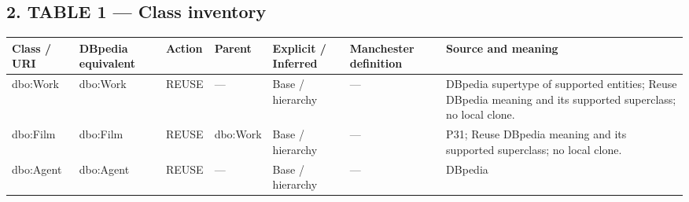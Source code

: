 \documentclass[
  11pt,
]{article}
\newcounter{none} %
\begin{document}
\subsection{2. TABLE 1 --- Class
inventory}\label{table-1-class-inventory}

{\def\LTcaptype{none} %
\begin{longtable}[]{@{}
  >{\raggedright\arraybackslash}p{}
  >{\raggedright\arraybackslash}p{}
  >{\raggedright\arraybackslash}p{}
  >{\raggedright\arraybackslash}p{}
  >{\raggedright\arraybackslash}p{}
  >{\raggedright\arraybackslash}p{}
  >{\raggedright\arraybackslash}p{}@{}}
\toprule\noalign{}
\begin{minipage}[b]{\linewidth}\raggedright
Class / URI
\end{minipage} & \begin{minipage}[b]{\linewidth}\raggedright
DBpedia equivalent
\end{minipage} & \begin{minipage}[b]{\linewidth}\raggedright
Action
\end{minipage} & \begin{minipage}[b]{\linewidth}\raggedright
Parent
\end{minipage} & \begin{minipage}[b]{\linewidth}\raggedright
Explicit / Inferred
\end{minipage} & \begin{minipage}[b]{\linewidth}\raggedright
Manchester definition
\end{minipage} & \begin{minipage}[b]{\linewidth}\raggedright
Source and meaning
\end{minipage} \\
\midrule\noalign{}
\endhead
\bottomrule\noalign{}
\endlastfoot
dbo:Work & dbo:Work & REUSE & --- & Base / hierarchy & --- & DBpedia
supertype of supported entities; Reuse DBpedia meaning and its supported
superclass; no local clone. \\
dbo:Film & dbo:Film & REUSE & dbo:Work & Base / hierarchy & --- & P31;
Reuse DBpedia meaning and its supported superclass; no local clone. \\
dbo:Agent & dbo:Agent & REUSE & --- & Base / hierarchy & --- & DBpedia

\end{longtable}}
\end{document}
